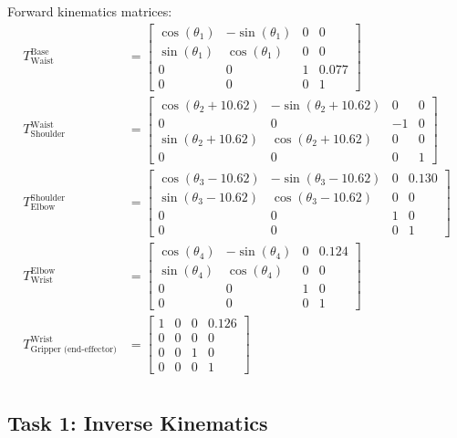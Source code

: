 \documentclass[9pt, a4paper]{article}
\begin{document}
Forward kinematics matrices:
\begin{align*}
  T^{\text{Base}}_{\text{Waist}} &= \begin{bmatrix}
    \cos(\theta_1) & -\sin(\theta_1) & 0 & 0 \\
    \sin(\theta_1) & \cos(\theta_1) & 0 & 0 \\ 
    0 & 0 & 1 & 0.077 \\
    0 & 0 & 0 & 1
    \end{bmatrix} \\ 
  T^{\text{Waist}}_{\text{Shoulder}} &= \begin{bmatrix}
    \cos(\theta_2 + 10.62) & -\sin(\theta_2 + 10.62) & 0 & 0 \\
    0 & 0 & -1 & 0 \\ 
    \sin(\theta_2 + 10.62) & \cos(\theta_2 + 10.62) & 0 & 0 \\
    0 & 0 & 0 & 1
    \end{bmatrix} \\
  T^{\text{Shoulder}}_{\text{Elbow}} &= \begin{bmatrix}
    \cos(\theta_3 - 10.62) & -\sin(\theta_3 - 10.62) & 0 & 0.130 \\
    \sin(\theta_3 - 10.62) & \cos(\theta_3 - 10.62) & 0 & 0 \\ 
    0 & 0 & 1 & 0 \\
    0 & 0 & 0 & 1
    \end{bmatrix} \\
  T^{\text{Elbow}}_{\text{Wrist}} &= \begin{bmatrix}
    \cos(\theta_4) & -\sin(\theta_4) & 0 & 0.124 \\
    \sin(\theta_4) & \cos(\theta_4) & 0 & 0 \\ 
    0 & 0 & 1 & 0 \\
    0 & 0 & 0 & 1 
    \end{bmatrix} \\
  T^{\text{Wrist}}_{\text{Gripper (end-effector)}} &= \begin{bmatrix}
    1 & 0 & 0 & 0.126 \\
    0 & 0 & 0 & 0 \\ 
    0 & 0 & 1 & 0 \\
    0 & 0 & 0 & 1 
    \end{bmatrix} \\  
\end{align*}

\subsection{Task 1: Inverse Kinematics}
\end{document}
